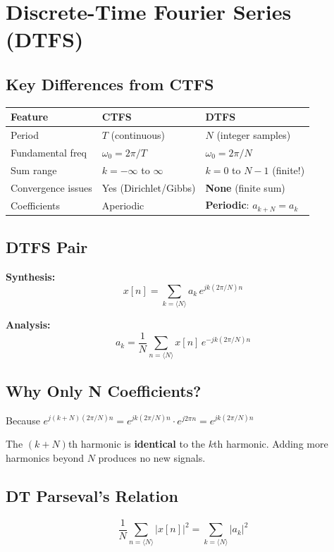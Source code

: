 \documentclass[11pt]{article}
\begin{document}
\section*{Discrete-Time Fourier Series (DTFS)}

\subsection*{Key Differences from CTFS}

\begin{center}
\begin{tabular}{|l|l|l|}
\hline
\textbf{Feature} & \textbf{CTFS} & \textbf{DTFS} \\
\hline
Period & $T$ (continuous) & $N$ (integer samples) \\
\hline
Fundamental freq & $\omega_0 = 2\pi/T$ & $\omega_0 = 2\pi/N$ \\
\hline
Sum range & $k = -\infty$ to $\infty$ & $k = 0$ to $N-1$ (finite!) \\
\hline
Convergence issues & Yes (Dirichlet/Gibbs) & \textbf{None} (finite sum) \\
\hline
Coefficients & Aperiodic & \textbf{Periodic}: $a_{k+N} = a_k$ \\
\hline
\end{tabular}
\end{center}

\subsection*{DTFS Pair}

\textbf{Synthesis:}
\[x[n] = \sum_{k=\langle N \rangle} a_k \, e^{jk(2\pi/N)n}\]

\textbf{Analysis:}
\[a_k = \frac{1}{N} \sum_{n=\langle N \rangle} x[n] \, e^{-jk(2\pi/N)n}\]

\subsection*{Why Only N Coefficients?}

Because $e^{j(k+N)(2\pi/N)n} = e^{jk(2\pi/N)n} \cdot e^{j2\pi n} = e^{jk(2\pi/N)n}$

The $(k+N)$th harmonic is \textbf{identical} to the $k$th harmonic. Adding more harmonics beyond $N$ produces no new signals.

\subsection*{DT Parseval's Relation}

\[\frac{1}{N} \sum_{n=\langle N \rangle} |x[n]|^2 = \sum_{k=\langle N \rangle} |a_k|^2\]
\end{document}
